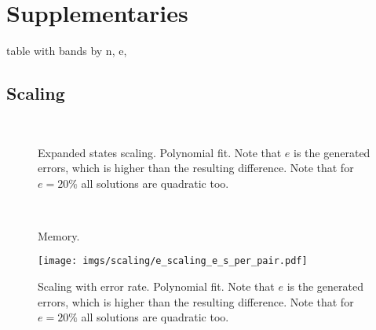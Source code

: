 \section{Supplementaries} \label{GLOBALsec:supplementaries}

table with bands by n, e, 

\subsection{Scaling}

\begin{figure}[t]
    \centering
    \\
    \caption{Expanded states scaling. Polynomial fit. Note that $e$ is the
      generated errors, which is higher than the resulting difference.
      Note that for $e=20\%$ all \A solutions are quadratic too.}
    \label{GLOBALfig:expanded_length_scaling}
\end{figure}

\begin{figure}[t]
    \centering
    \\
    \caption{Memory.}
    \label{GLOBALfig:memory_length_scaling}
\end{figure}

\begin{figure}[t]
    \centering
    \texttt{[image: imgs/scaling/e\_scaling\_e\_s\_per\_pair.pdf]}
    \caption{Scaling with error rate. Polynomial fit. Note that $e$ is the generated errors, which is higher than the resulting difference. Note that for $e=20\%$ all \A solutions are quadratic too.}
    \label{GLOBALfig:scaling_with_e}
\end{figure}


